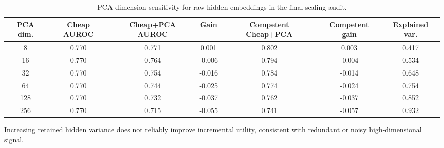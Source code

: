 \begin{table}[t]
\centering
\small
\caption{PCA-dimension sensitivity for raw hidden embeddings in the final scaling audit.}
\label{tab:pca-dim}
\begin{threeparttable}
\begin{adjustbox}{width=\textwidth}
\begin{tabular}{ccccccc}
\toprule
PCA dim. & Cheap AUROC & Cheap+PCA AUROC & Gain & Competent Cheap+PCA & Competent gain & Explained var. \\
\midrule
8 & 0.770 & 0.771 & 0.001 & 0.802 & 0.003 & 0.417 \\
16 & 0.770 & 0.764 & -0.006 & 0.794 & -0.004 & 0.534 \\
32 & 0.770 & 0.754 & -0.016 & 0.784 & -0.014 & 0.648 \\
64 & 0.770 & 0.744 & -0.025 & 0.774 & -0.024 & 0.754 \\
128 & 0.770 & 0.732 & -0.037 & 0.762 & -0.037 & 0.852 \\
256 & 0.770 & 0.715 & -0.055 & 0.741 & -0.057 & 0.932 \\
\bottomrule
\end{tabular}
\end{adjustbox}

\begin{tablenotes}[flushleft]\footnotesize\item \parbox{0.95\textwidth}{Increasing retained hidden variance does not reliably improve incremental utility, consistent with redundant or noisy high-dimensional signal.}\end{tablenotes}
\end{threeparttable}
\end{table}
